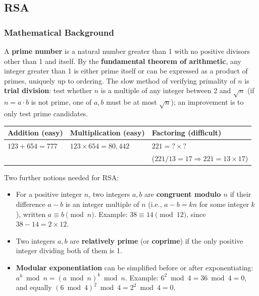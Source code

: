 \documentclass[12pt, a4paper]{article}
\begin{document}
\subsection{RSA}
\label{subsec:rsa-04}

\subsubsection{Mathematical Background}
A \textbf{prime number} is a natural number greater than 1 with no positive divisors other than 1 and itself. By the \textbf{fundamental theorem of arithmetic}, any integer greater than 1 is either prime itself or can be expressed as a product of primes, uniquely up to ordering. The slow method of verifying primality of $n$ is \textbf{trial division}: test whether $n$ is a multiple of any integer between 2 and $\sqrt{n}$ (if $n=a\cdot b$ is not prime, one of $a,b$ must be at most $\sqrt{n}$); an improvement is to only test prime candidates.

\begin{center}
\begin{tabular}{@{}lll@{}}
\toprule
\textbf{Addition (easy)} & \textbf{Multiplication (easy)} & \textbf{Factoring (difficult)} \\
\midrule
$123+654=777$ & $123 \times 654 = 80{,}442$ & $221 = {?}\times{?}$ \\
 & & ($221/13 = 17 \Rightarrow 221=13\times17$) \\
\bottomrule
\end{tabular}
\end{center}

Two further notions needed for RSA:
\begin{itemize}
    \item For a positive integer $n$, two integers $a,b$ are \textbf{congruent modulo $n$} if their difference $a-b$ is an integer multiple of $n$ (i.e., $a-b=kn$ for some integer $k$), written $a \equiv b \pmod{n}$. Example: $38 \equiv 14 \pmod{12}$, since $38-14=2\times12$.
    \item Two integers $a,b$ are \textbf{relatively prime} (or \textbf{coprime}) if the only positive integer dividing both of them is 1.
    \item \textbf{Modular exponentiation} can be simplified before or after exponentiating: $a^k \bmod n = (a \bmod n)^k \bmod n$. Example: $6^2 \bmod 4 = 36 \bmod 4 = 0$, and equally $(6\bmod 4)^2 \bmod 4 = 2^2 \bmod 4 = 0$.
\end{itemize}
\end{document}
